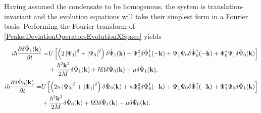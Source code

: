 Having assumed the condensate to be homogenous, the system is translation-invariant and the evolution equations will take their simplest form in a Fourier basis. Performing the Fourier transform of \eqref{Peaks:DeviationOperatorsEvolutionXSpace} yields
\begin{subequations}
    \label{Peaks:DeviationOperatorsEvolutionKSpace}
    \begin{align}
        \begin{split}
            i \hbar \frac{\partial \delta \hat{\Psi}_1(\mathbf{k})}{\partial t} =& U\left[ \left(2\abs{\Psi_1}^2+\abs{\Psi_0}^2 \right)\delta \hat{\Psi}_1(\mathbf{k}) + \Psi_1^2\delta\hat{\Psi}_1^\dagger(-\mathbf{k}) + \Psi_1\Psi_0\delta\hat{\Psi}_0^\dagger(-\mathbf{k}) + \Psi_0^*\Psi_1\delta\hat{\Psi}_0(\mathbf{k})\right]\\
                    & +\frac{\hbar^2 \mathbf{k}^2}{2M} \delta \hat{\Psi}_1(\mathbf{k}) +\hbar \Omega\delta\hat{\Psi}_0(\mathbf{k})- \mu \delta \hat{\Psi}_1(\mathbf{k}),
        \end{split}\\
        \begin{split}
        i \hbar \frac{\partial \delta \hat{\Psi}_0(\mathbf{k})}{\partial t} =& U\left[\left(2\kappa \abs{\Psi_0}^2 +\abs{\Psi_1}^2\right)\delta\hat{\Psi}_0(\mathbf{k}) + \kappa \Psi_0^2 \delta\hat{\Psi}_0^\dagger(-\mathbf{k}) + \Psi_1\Psi_0\delta\hat{\Psi}_1^\dagger(-\mathbf{k}) + \Psi_1^*\Psi_0\delta\hat{\Psi}_1(\mathbf{k})\right]\\
                    & +\frac{\hbar^2 \mathbf{k}^2}{2M} \delta \hat{\Psi}_0(\mathbf{k}) +\hbar \Omega\delta\hat{\Psi}_1(\mathbf{k}) - \mu \delta\hat{\Psi}_0(\mathbf{k}).
        \end{split}
    \end{align}
\end{subequations}

